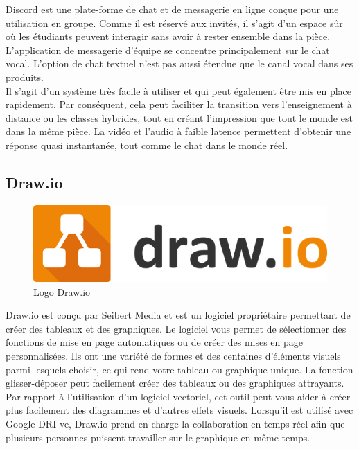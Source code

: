     Discord\cite{discord} est une plate-forme de chat et de messagerie en ligne conçue pour une utilisation en groupe. Comme il est réservé aux invités, il s'agit d'un espace sûr où les étudiants peuvent interagir sans avoir à rester ensemble dans la pièce. L'application de messagerie d'équipe se concentre principalement sur le chat vocal. L'option de chat textuel n'est pas aussi étendue que le canal vocal dans ses produits.\\

    Il s'agit d'un système très facile à utiliser et qui peut également être mis en place rapidement. Par conséquent, cela peut faciliter la transition vers l'enseignement à distance ou les classes hybrides, tout en créant l'impression que tout le monde est dans la même pièce. La vidéo et l'audio à faible latence permettent d'obtenir une réponse quasi instantanée, tout comme le chat dans le monde réel.\\

    \subsection{Draw.io}
    \begin{figure}[H]
        \centering
        \includegraphics[scale=0.4]{ACR/Drawio-Logo.png}
        \caption{Logo Draw.io}
    \end{figure}

    Draw.io\cite{drawio} est conçu par Seibert Media et est un logiciel propriétaire permettant de créer des tableaux et des graphiques. Le logiciel vous permet de sélectionner des fonctions de mise en page automatiques ou de créer des mises en page personnalisées. Ils ont une variété de formes et des centaines d'éléments visuels parmi lesquels choisir, ce qui rend votre tableau ou graphique unique. La fonction glisser-déposer peut facilement créer des tableaux ou des graphiques attrayants.\\

    Par rapport à l'utilisation d'un logiciel vectoriel, cet outil peut vous aider à créer plus facilement des diagrammes et d'autres effets visuels. Lorsqu'il est utilisé avec Google \acs{DRI} ve, Draw.io prend en charge la collaboration en temps réel afin que plusieurs personnes puissent travailler sur le graphique en même temps.\\

